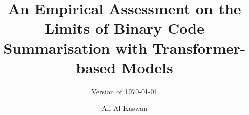 \documentclass[twoside,a4paper,12pt]{memoir}
\title{An Empirical Assessment on the Limits of Binary Code Summarisation with Transformer-based Models}
\subtitle{Version of \today}
\author{Ali Al-Kaswan}                               %
\begin{document}
\frontmatter
\thispagestyle{empty}
\makeformaltitlepages{}         %



\cleardoublepage\tableofcontents
\cleardoublepage\listoffigures
\cleardoublepage\mainmatter













\appendix
\def\chaptername{Appendix}

% 
\end{document}
